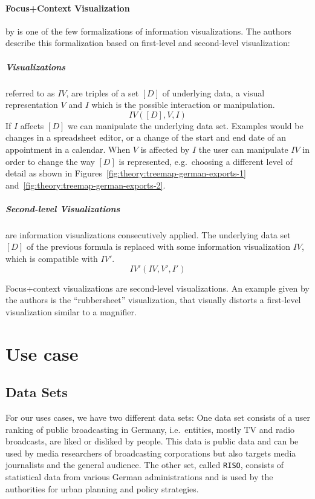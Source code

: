 \documentclass{article}
\newcommand{\riso}{\texttt{RISO}}
\begin{document}
\paragraph{Focus+Context Visualization} by \textcite{Bjork1999} is one of the few formalizations of information visualizations.
The authors describe this formalization based on first-level and second-level visualization:
\subparagraph{Visualizations} referred to as $IV$, are triples of a set $[D]$ of underlying data, a visual representation $V$ and $I$ which is the possible interaction or manipulation. 
\begin{equation}
  IV([D], V, I)
\end{equation}
If $I$ affects $[D]$ we can manipulate the underlying data set.
Examples would be changes in a spreadsheet editor, or a change of the start and end date of an appointment in a calendar.
When $V$ is affected by $I$ the user can manipulate $IV$ in order to change the way $[D]$ is represented, e.g.\ choosing a different level of detail as shown in Figures~\ref{fig:theory:treemap-german-exports-1} and~\ref{fig:theory:treemap-german-exports-2}.

\subparagraph{Second-level Visualizations} are information visualizations consecutively applied.
The underlying data set $[D]$ of the previous formula is replaced with some information visualization $IV$, which is compatible with $IV'$.
\begin{equation}
  IV'(IV, V', I')
\end{equation}


Focus+context visualizations are second-level visualizations.
An example given by the authors is the  ``rubbersheet'' visualization, that visually distorts a first-level visualization similar to a magnifier.




\clearpage
\section{Use case}\label{sec:use-case}

\subsection{Data Sets}
For our uses cases, we have two different data sets:
One data set consists of a user ranking of public broadcasting in Germany, i.e.\ entities, mostly TV and radio broadcasts, are liked or disliked by people.
This data is public data and can be used by media researchers of broadcasting corporations but also targets media journalists and the general audience.
The other set, called \riso{}, consists of statistical data from various German administrations and is used by the authorities for urban planning and policy strategies.
\end{document}
